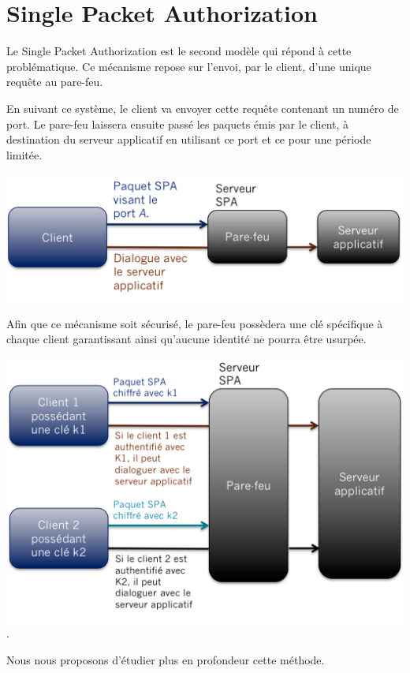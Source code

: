 \chapter{Single Packet Authorization}

Le Single Packet Authorization est le second modèle qui répond à cette problématique. Ce mécanisme repose sur l'envoi, par le client, d'une unique requête au pare-feu.

En suivant ce système, le client va envoyer cette requête contenant un numéro de port. Le pare-feu laissera ensuite passé les paquets émis par le client, à destination du serveur applicatif en utilisant ce port et ce pour une période limitée.

\includegraphics[scale=0.5]{spa_general_1}

Afin que ce mécanisme soit sécurisé, le pare-feu possèdera une clé spécifique à chaque client garantissant ainsi qu'aucune identité ne pourra être usurpée.

\includegraphics[scale=0.5]{spa_general_2}.

Nous nous proposons d'étudier plus en profondeur cette méthode.
